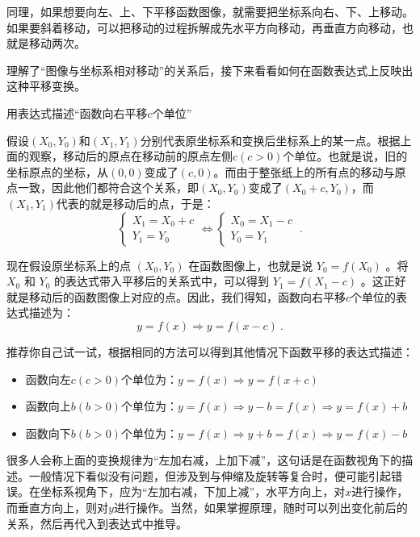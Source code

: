 同理，如果想要向左、上、下平移函数图像，就需要把坐标系向右、下、上移动。如果要斜着移动，可以把移动的过程拆解成先水平方向移动，再垂直方向移动，也就是移动两次。

理解了“图像与坐标系相对移动”的关系后，接下来看看如何在函数表达式上反映出这种平移变换。

\begin{example}{用表达式描述“函数向右平移$c$个单位”}

假设$(X_0,Y_0)$和$(X_1,Y_1)$分别代表原坐标系和变换后坐标系上的某一点。根据上面的观察，移动后的原点在移动前的原点左侧$c(c>0)$个单位。也就是说，旧的坐标原点的坐标，从$(0,0)$变成了$(c,0)$。而由于整张纸上的所有点的移动与原点一致，因此他们都符合这个关系，即$(X_0,Y_0)$变成了$(X_0+c,Y_0)$，而$(X_1,Y_1)$代表的就是移动后的点，于是：
\begin{equation}
\begin{cases}
X_1=X_0+c\\
Y_1=Y_0
\end{cases}\iff
\begin{cases}
X_0=X_1-c\\
Y_0=Y_1
\end{cases}~.
\end{equation}

现在假设原坐标系上的点  $(X_0, Y_0)$  在函数图像上，也就是说  $Y_0 = f(X_0)$ 。将  $X_0$  和  $Y_0$  的表达式带入平移后的关系式中，可以得到  $Y_1 = f(X_1 - c)$ 。这正好就是移动后的函数图像上对应的点。因此，我们得知，函数向右平移$c$个单位的表达式描述为：
\begin{equation}
y=f(x)\Rightarrow y=f(x-c)~.
\end{equation}
\end{example}

推荐你自己试一试，根据相同的方法可以得到其他情况下函数平移的表达式描述：
\begin{itemize}
\item 函数向左$c(c>0)$个单位为：$y=f(x)\Rightarrow y=f(x+c)$
\item 函数向上$b(b>0)$个单位为：$y=f(x)\Rightarrow y-b=f(x)\Rightarrow y=f(x)+b$
\item 函数向下$b(b>0)$个单位为：$y=f(x)\Rightarrow y+b=f(x)\Rightarrow y=f(x)-b$
\end{itemize}

很多人会称上面的变换规律为“左加右减，上加下减”，这句话是在函数视角下的描述。一般情况下看似没有问题，但涉及到与伸缩及旋转等复合时，便可能引起错误。在坐标系视角下，应为“左加右减，下加上减”，水平方向上，对$x$进行操作，而垂直方向上，则对$y$进行操作。当然，如果掌握原理，随时可以列出变化前后的关系，然后再代入到表达式中推导。

